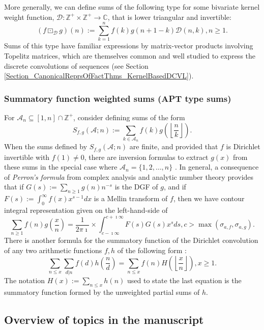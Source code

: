 \documentclass[12pt,reqno,a4letter]{article}
\numberwithin{figure}{section}
\numberwithin{table}{section}
\numberwithin{equation}{section}
\newcommand{\Floor}[2]{\ensuremath{\left\lfloor \frac{#1}{#2} \right\rfloor}}
\theoremstyle{plain}
\numberwithin{theorem}{section}
\theoremstyle{definition}
\begin{document}
More generally, we can define sums of the following type 
for some bivariate kernel weight function, 
$\mathcal{D}: \mathbb{Z}^{+} \times \mathbb{Z}^{+} \rightarrow \mathbb{C}$, 
that is lower triangular and invertible:
\[
(f \boxdot_{\mathcal{D}} g)(n) := \sum_{k=1}^{n} f(k) g(n+1-k) \mathcal{D}(n, k), n \geq 1. 
\]
Sums of this type have familiar expressions by matrix-vector products involving Topelitz matrices, 
which are themselves common and well studied to express the discrete convolutions of sequences 
(see Section \ref{Section_CanonicalReprsOfFactThms_KernelBasedDCVL}). 

\subsubsection{Summatory function weighted sums (APT type sums)} 

For $\mathcal{A}_n \subseteq [1, n] \cap \mathbb{Z}^{+}$, consider defining sums of the form 
\[
S_{f,g}(\mathcal{A}; n) := \sum_{k \in \mathcal{A}_n} f(k) g\left(\Floor{n}{k}\right). 
\]
When the sums defined by $S_{f,g}(\mathcal{A}; n)$ 
are finite, and provided that $f$ is Dirichlet invertible
with $f(1) \neq 0$, there are inversion formulas to extract $g(x)$ from 
these sums in the special case where $\mathcal{A}_n = \{1,2,\ldots, n\}$ \cite{APOSTOLANUMT}. 
In general, a consequence of 
\emph{Perron's formula} from complex analysis and analytic number theory provides that if 
$G(s) := \sum_{n \geq 1} g(n) n^{-s}$ is the DGF of $g$, and if 
$F(s) := \int_0^{\infty} f(x) x^{s-1} dx$ is a Mellin transform of $f$, then we have 
contour integral representation given on the left-hand-side of 
\[
\sum_{n \geq 1} f(n) g\left(\frac{x}{n}\right) = 
     \frac{1}{2\pi\imath} \times \int_{c-\imath\infty}^{c+\imath\infty} 
     F(s) G(s) x^{s} ds, c > \max(\sigma_{a,f}, \sigma_{a,g}). 
\]
There is another formula for the summatory function of the Dirichlet convolution 
of any two arithmetic functions $f,h$ of the following form \cite{APOSTOLANUMT}: 
\[
\sum_{n \leq x} \sum_{d|n} f(d) h\left(\frac{n}{d}\right) = \sum_{n \leq x} 
     f(n) H\left(\Floor{x}{n}\right), x \geq 1. 
\]
The notation $H(x) := \sum_{n \leq x} h(n)$ used to state the last equation is 
the summatory function formed by the unweighted partial sums of $h$. 

\subsection{Overview of topics in the manuscript}
\end{document}
